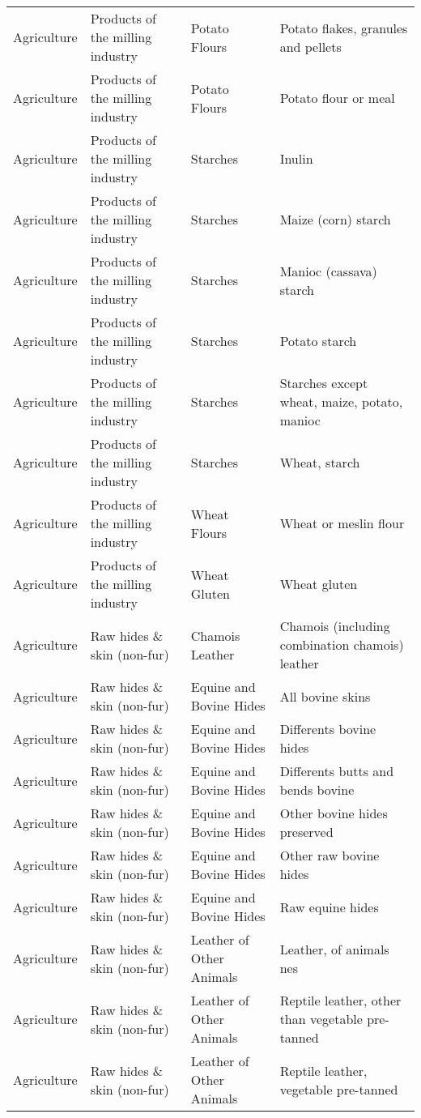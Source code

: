 \begin{appendices}
\begin{xltabular}{\textwidth}{|p{0.07\textwidth}|p{0.28\textwidth}|p{0.24\textwidth}|p{0.31\textwidth}|}
	Agriculture & Products of the milling industry & Potato Flours & Potato flakes, granules and pellets \\
	Agriculture & Products of the milling industry & Potato Flours & Potato flour or meal \\
	Agriculture & Products of the milling industry & Starches & Inulin \\
	Agriculture & Products of the milling industry & Starches & Maize (corn) starch \\
	Agriculture & Products of the milling industry & Starches & Manioc (cassava) starch \\
	Agriculture & Products of the milling industry & Starches & Potato starch \\
	Agriculture & Products of the milling industry & Starches & Starches except wheat, maize, potato, manioc \\
	Agriculture & Products of the milling industry & Starches & Wheat, starch \\
	Agriculture & Products of the milling industry & Wheat Flours & Wheat or meslin flour \\
	Agriculture & Products of the milling industry & Wheat Gluten & Wheat gluten \\
	Agriculture & Raw hides \& skin (non-fur) & Chamois Leather & Chamois (including combination chamois) leather \\
	Agriculture & Raw hides \& skin (non-fur) & Equine and Bovine Hides & All bovine skins \\
	Agriculture & Raw hides \& skin (non-fur) & Equine and Bovine Hides & Differents bovine hides \\
	Agriculture & Raw hides \& skin (non-fur) & Equine and Bovine Hides & Differents butts and bends bovine \\
	Agriculture & Raw hides \& skin (non-fur) & Equine and Bovine Hides & Other bovine hides preserved \\
	Agriculture & Raw hides \& skin (non-fur) & Equine and Bovine Hides & Other raw bovine hides \\
	Agriculture & Raw hides \& skin (non-fur) & Equine and Bovine Hides & Raw equine hides \\
	Agriculture & Raw hides \& skin (non-fur) & Leather of Other Animals & Leather, of animals nes \\
	Agriculture & Raw hides \& skin (non-fur) & Leather of Other Animals & Reptile leather, other than vegetable pre-tanned \\
	Agriculture & Raw hides \& skin (non-fur) & Leather of Other Animals & Reptile leather, vegetable pre-tanned \\

\end{xltabular}
\end{appendices}
